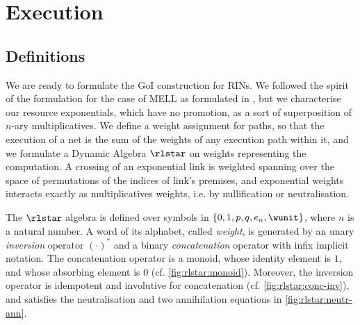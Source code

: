 \section{Execution} \label{sec:Ex}

\subsection{Definitions}
We are ready to formulate the GoI construction for RINs.
We followed the spirit of the formulation for the case of MELL as formulated in 
\cite{DanosRegnier:1995}, but we characterise our resource exponentials,
which have no promotion, as a sort of superposition of $n$-ary multiplicatives.
We define a weight assignment for paths, so that the execution of a net is
the sum of the weights of any execution path within it, and we formulate a 
Dynamic Algebra $\rlstar$ on weights representing the computation.
A crossing of an exponential link is weighted spanning over the space of 
permutations of the indices of link's premises, and exponential weights 
interacts exactly as multiplicatives weights, i.e. by nullification or 
neutralisation.

\begin{definition}\label{def:rlstar}
The $\rlstar$ algebra is defined over symbols in
$\lbrace 0, 1, p, q, e_n, \wunit \rbrace$, where $n$ is a natural number.
A word of its alphabet, called \textit{weight}, is generated by an unary 
\textit{inversion} operator $(\cdot)^*$ and a binary \textit{concatenation} 
operator with infix implicit notation.
The concatenation operator is a monoid, whose identity element is $1$, and 
whose absorbing element is $0$ (cf. \autoref{fig:rlstar:monoid}).
Moreover, the inversion operator is idempotent and involutive for concatenation
(cf. \autoref{fig:rlstar:conc-inv}), and satisfies the neutralisation and 
two annihilation equations in \autoref{fig:rlstar:neutr-ann}.
\end{definition}

